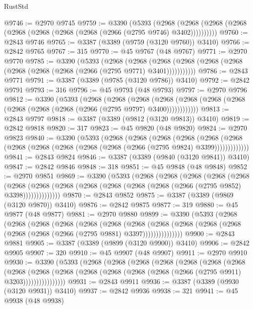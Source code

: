 \begin{lexlean}{RustStd}
\begin{coremodule}
@9746 := @2970 @9745
@9759 := @3390
    (@5393
      (@2968 (@2968 (@2968 (@2968 (@2968 (@2968 (@2968 (@2968 (@2966 (@2795 @9746) @3402))))))))))
@9760 := @2843 @9746
@9765 := @3387 (@3389 (@9759 (@3120 @9760)) @3410)
@9766 := @2842 @9765
@9767 := 315
@9770 := @45 @9767 (@48 @9767)
@9771 := @2970 @9770
@9785 := @3390
    (@5393
      (@2968
        (@2968
          (@2968 (@2968 (@2968 (@2968 (@2968 (@2968 (@2968 (@2966 (@2795 @9771) @3401)))))))))))
@9786 := @2843 @9771
@9791 := @3387 (@3389 (@9785 (@3120 @9786)) @3410)
@9792 := @2842 @9791
@9793 := 316
@9796 := @45 @9793 (@48 @9793)
@9797 := @2970 @9796
@9812 := @3390
    (@5393
      (@2968
        (@2968
          (@2968
            (@2968 (@2968 (@2968 (@2968 (@2968 (@2968 (@2968 (@2966 (@2795 @9797) @3400))))))))))))
@9813 := @2843 @9797
@9818 := @3387 (@3389 (@9812 (@3120 @9813)) @3410)
@9819 := @2842 @9818
@9820 := 317
@9823 := @45 @9820 (@48 @9820)
@9824 := @2970 @9823
@9840 := @3390
    (@5393
      (@2968
        (@2968
          (@2968
            (@2968
              (@2968
                (@2968 (@2968 (@2968 (@2968 (@2968 (@2968 (@2966 (@2795 @9824) @3399)))))))))))))
@9841 := @2843 @9824
@9846 := @3387 (@3389 (@9840 (@3120 @9841)) @3410)
@9847 := @2842 @9846
@9848 := 318
@9851 := @45 @9848 (@48 @9848)
@9852 := @2970 @9851
@9869 := @3390
    (@5393
      (@2968
        (@2968
          (@2968
            (@2968
              (@2968
                (@2968
                  (@2968 (@2968 (@2968 (@2968 (@2968 (@2968 (@2966 (@2795 @9852) @3398))))))))))))))
@9870 := @2843 @9852
@9875 := @3387 (@3389 (@9869 (@3120 @9870)) @3410)
@9876 := @2842 @9875
@9877 := 319
@9880 := @45 @9877 (@48 @9877)
@9881 := @2970 @9880
@9899 := @3390
    (@5393
      (@2968
        (@2968
          (@2968
            (@2968
              (@2968
                (@2968
                  (@2968
                    (@2968
                      (@2968 (@2968 (@2968 (@2968 (@2968 (@2966 (@2795 @9881) @3397)))))))))))))))
@9900 := @2843 @9881
@9905 := @3387 (@3389 (@9899 (@3120 @9900)) @3410)
@9906 := @2842 @9905
@9907 := 320
@9910 := @45 @9907 (@48 @9907)
@9911 := @2970 @9910
@9930 := @3390
    (@5393
      (@2968
        (@2968
          (@2968
            (@2968
              (@2968
                (@2968
                  (@2968
                    (@2968
                      (@2968
                        (@2968
                          (@2968 (@2968 (@2968 (@2968 (@2966 (@2795 @9911) @3203))))))))))))))))
@9931 := @2843 @9911
@9936 := @3387 (@3389 (@9930 (@3120 @9931)) @3410)
@9937 := @2842 @9936
@9938 := 321
@9941 := @45 @9938 (@48 @9938)

\end{coremodule}
\end{lexlean}
